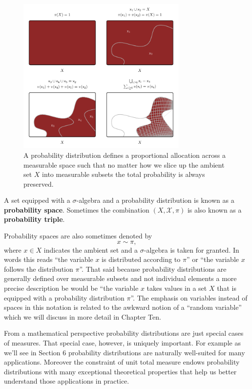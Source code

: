 \documentclass[
  letterpaper,
  DIV=11,
  numbers=noendperiod]{scrartcl}
\begin{document}
\begin{figure}

{\centering \includegraphics[width=0.75\textwidth,height=\textheight]{figures/distribution/distribution.pdf}

}

\caption{\label{fig-distribution}A probability distribution defines a
proportional allocation across a measurable space such that no matter
how we slice up the ambient set \(X\) into measurable subsets the total
probability is always preserved.}

\end{figure}

A set equipped with a \(\sigma\)-algebra and a probability distribution
is known as a \textbf{probability space}. Sometimes the combination
\((X, \mathcal{X}, \pi)\) is also known as a \textbf{probability
triple}.

Probability spaces are also sometimes denoted by \[
x \sim \pi,
\] where \(x \in X\) indicates the ambient set and a \(\sigma\)-algebra
is taken for granted. In words this reads ``the variable \(x\) is
distributed according to \(\pi\)'' or ``the variable \(x\) follows the
distribution \(\pi\)''. That said because probability distributions are
generally defined over measurable subsets and not individual elements a
more precise description be would be ``the variable \(x\) takes values
in a set \(X\) that is equipped with a probability distribution
\(\pi\)''. The emphasis on variables instead of spaces in this notation
is related to the awkward notion of a ``random variable'' which we will
discuss in more detail in Chapter Ten.

From a mathematical perspective probability distributions are just
special cases of measures. That special case, however, is uniquely
important. For example as we'll see in
\protect\hypertarget{sec:interpretations}{}{Section 6} probability
distributions are naturally well-suited for many applications. Moreover
the constraint of unit total measure endows probability distributions
with many exceptional theoretical properties that help us better
understand those applications in practice.
\end{document}
